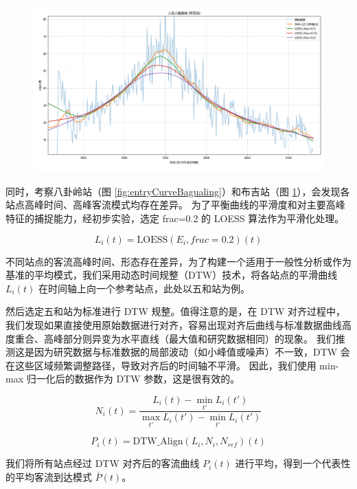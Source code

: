 \begin{figure}[htbp]
    \centering
    \includegraphics[width=1.0\textwidth]{res/Figure_3.png}
    \label{fig:entryCurveBuji}
\end{figure}

同时，考察八卦岭站（图 \ref{fig:entryCurveBagualing}）和布吉站（图 \ref{fig:entryCurveBuji}），会发现各站点高峰时间、高峰客流模式均存在差异。
为了平衡曲线的平滑度和对主要高峰特征的捕捉能力，经初步实验，选定 frac=0.2 的 LOESS 算法作为平滑化处理。

$$
L_i(t) = \text{LOESS}(E_i, frac=0.2)(t)
$$

不同站点的客流高峰时间、形态存在差异，为了构建一个适用于一般性分析或作为基准的平均模式，我们采用动态时间规整（DTW）\cite{DTW}技术，将各站点的平滑曲线 $L_i(t)$ 在时间轴上向一个参考站点，此处以五和站为例。

然后选定五和站为标准进行 DTW 规整。值得注意的是，在 DTW 对齐过程中，我们发现如果直接使用原始数据进行对齐，容易出现对齐后曲线与标准数据曲线高度重合、高峰部分则异变为水平直线（最大值和研究数据相同）的现象。
我们推测这是因为研究数据与标准数据的局部波动（如小峰值或噪声）不一致，DTW 会在这些区域频繁调整路径，导致对齐后的时间轴不平滑。
因此，我们使用 min-max 归一化后的数据作为 DTW 参数，这是很有效的。

$$
N_i(t) = \frac{L_i(t) - \min_{t'}L_i(t')}{\max_{t'}L_i(t') - \min_{t'}L_i(t')}
$$

$$
P_i(t) = \text{DTW\_Align}(L_i, N_i, N_{ref})(t)
$$

我们将所有站点经过 DTW 对齐后的客流曲线 $P_i(t)$ 进行平均，得到一个代表性的平均客流到达模式 $\bar{P}(t)$。

